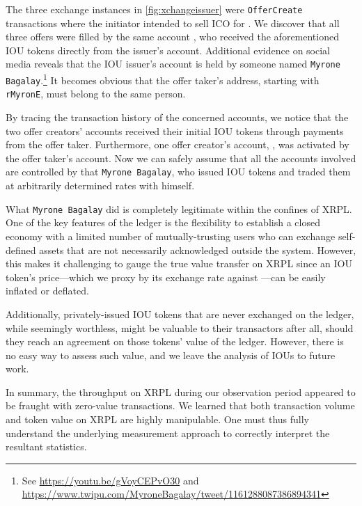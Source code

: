 The three exchange instances in \autoref{fig:xchangeissuer} were \texttt{OfferCreate} transactions where the initiator intended to sell  ICO for .
We discover that all three offers were filled by the same account , who received the aforementioned  IOU tokens directly from the issuer's account.
Additional evidence on social media reveals that the IOU issuer's account is held by someone named \texttt{Myrone Bagalay}.\footnote{See \url{https://youtu.be/gVoyCEPvO30} and \url{https://www.twipu.com/MyroneBagalay/tweet/1161288087386894341}}
It becomes obvious that the offer taker's address, starting with \texttt{rMyronE}, must belong to the same person.

By tracing the transaction history of the concerned accounts, we notice that the two offer creators' accounts received their initial  IOU tokens through payments from the offer taker.
Furthermore, one offer creator's account, , was activated by the offer taker's account.
Now we can safely assume that all the accounts involved are controlled by that \texttt{Myrone Bagalay}, who issued  IOU tokens and traded them at arbitrarily determined rates with himself.

What \texttt{Myrone Bagalay} did is completely legitimate within the confines of XRPL.
One of the key features of the ledger is the flexibility to establish a closed economy with a limited number of mutually-trusting users who can exchange self-defined assets that are not necessarily acknowledged outside the system.
However, this makes it challenging to gauge the true value transfer on XRPL since an IOU token's price---which we proxy by its exchange rate against ---can be easily inflated or deflated.

Additionally, privately-issued IOU tokens that are never exchanged on the ledger, while seemingly worthless, might be valuable to their transactors after all, should they reach an agreement on those tokens' value of the ledger. However, there is no easy way to assess such value, and we leave the analysis of IOUs to future work.

In summary, the throughput on XRPL during our observation period appeared to be fraught with zero-value transactions.
We learned that both transaction volume and token value on XRPL are highly manipulable.
One must thus fully understand the underlying measurement approach to correctly interpret the resultant statistics.
